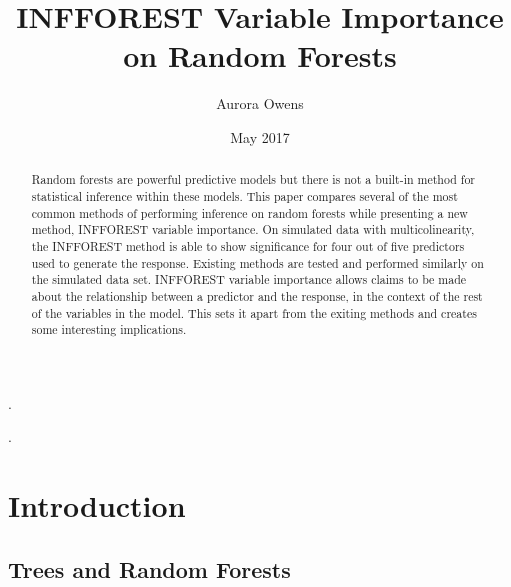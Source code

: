 \documentclass[12pt,twoside]{reedthesis}
\title{INFFOREST Variable Importance on Random Forests}
\author{Aurora Owens}
\date{May 2017}
\begin{document}
      \maketitle
  
  \frontmatter %
  \pagestyle{empty} %

      \begin{acknowledgements}
      .
    \end{acknowledgements}
  
  
      \hypersetup{linkcolor=black}
    \setcounter{tocdepth}{2}
    \tableofcontents
  
      \listoftables
  
      \listoffigures
  
      \begin{abstract}
      Random forests are powerful predictive models but there is not a
      built-in method for statistical inference within these models. This
      paper compares several of the most common methods of performing
      inference on random forests while presenting a new method, INFFOREST
      variable importance. On simulated data with multicolinearity, the
      INFFOREST method is able to show significance for four out of five
      predictors used to generate the response. Existing methods are tested
      and performed similarly on the simulated data set. INFFOREST variable
      importance allows claims to be made about the relationship between a
      predictor and the response, in the context of the rest of the variables
      in the model. This sets it apart from the exiting methods and creates
      some interesting implications.\par
    \end{abstract}
  
      \begin{dedication}
      .
    \end{dedication}
  
  \mainmatter %
  \pagestyle{fancyplain} %

  \chapter{Introduction}\label{introduction}
  
  \section{Trees and Random Forests}\label{trees-and-random-forests}
  
\end{document}
